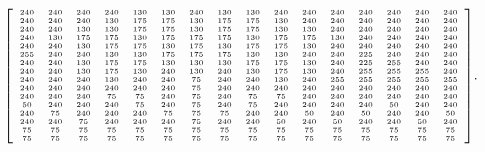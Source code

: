 \[\tiny{ \left[ \begin{array}{cccccccccccccccc} 240&240&240&240&130&130&240&
130&130&240&240&240&240&240&240&240\\ 240&240&240&
130&175&175&130&175&175&130&240&240&240&240&240&240
\\ 240&240&130&130&175&175&130&175&175&130&130&240&
240&240&240&240\\ 240&130&175&175&130&175&175&175&
130&175&175&130&240&240&240&240\\ 240&240&130&175&
175&130&175&130&175&175&130&240&240&240&240&240\\ 
255&240&240&130&130&175&175&175&130&130&240&240&225&240&240&240
\\ 240&240&130&175&175&130&130&130&175&175&130&240&
225&255&240&240\\ 240&240&130&175&130&240&130&240&
130&175&130&240&255&255&255&240\\ 240&240&240&130&
240&240&75&240&240&130&240&255&255&255&255&255\\ 240
&240&240&240&240&240&75&240&240&240&240&240&240&240&240&240
\\ 240&240&240&75&75&240&75&240&75&75&240&240&240&
240&240&240\\ 50&240&240&240&75&240&75&240&75&240&
240&240&240&50&240&240\\ 240&75&240&240&240&75&75&75
&240&240&50&240&50&240&240&50\\ 240&240&75&240&240&
240&75&240&240&50&240&50&240&240&50&240\\ 75&75&75&
75&75&75&75&75&75&75&75&75&75&75&75&75\\ 75&75&75&75
&75&75&75&75&75&75&75&75&75&75&75&75 \end{array} \right]}.\]



